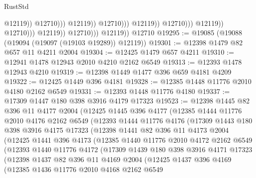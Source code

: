 \begin{lexlean}{RustStd}
\begin{coremodule}
                                                          @12119))
                                                      @12710)))
                                                @12119))
                                            @12710)))
                                      @12119))
                                  @12710)))
                            @12119))
                        @12710)))
                  @12119))
              @12710)))
        @12119))
    @12710
@19295 := @19085 (@19088 (@19094 (@19097 (@19103 @19289)) @12119))
@19301 := @12398 @1479 @82 @657 @11 @4211 @2004
@19304 := @12425 @1479 @657 @4211
@19310 := @12941 @1478 @12943 @2010 @4210 @2162 @6549
@19313 := @12393 @1478 @12943 @4210
@19319 := @12398 @1449 @1477 @396 @659 @4181 @4209
@19322 := @12425 @1449 @396 @4181
@19328 := @12385 @1448 @11776 @2010 @4180 @2162 @6549
@19331 := @12393 @1448 @11776 @4180
@19337 := @17309 @1447 @180 @398 @3916 @4179 @17323
@19523 := @12398
    @1445
    @82
    @396
    @11
    @4177
    @2004
    (@12425
      @1445
      @396
      @4177
      (@12385
        @1444
        @11776
        @2010
        @4176
        @2162
        @6549
        (@12393
          @1444
          @11776
          @4176
          (@17309
            @1443
            @180
            @398
            @3916
            @4175
            @17323
            (@12398
              @1441
              @82
              @396
              @11
              @4173
              @2004
              (@12425
                @1441
                @396
                @4173
                (@12385
                  @1440
                  @11776
                  @2010
                  @4172
                  @2162
                  @6549
                  (@12393
                    @1440
                    @11776
                    @4172
                    (@17309
                      @1439
                      @180
                      @398
                      @3916
                      @4171
                      @17323
                      (@12398
                        @1437
                        @82
                        @396
                        @11
                        @4169
                        @2004
                        (@12425
                          @1437
                          @396
                          @4169
                          (@12385
                            @1436
                            @11776
                            @2010
                            @4168
                            @2162
                            @6549

\end{coremodule}
\end{lexlean}
